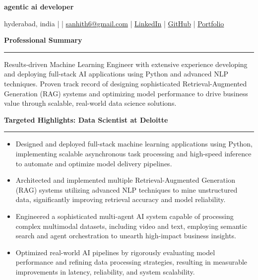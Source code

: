 \documentclass[9pt, letterpaper]{article}
\newcommand{\name}[1]{%
    \begin{center}
        {\LARGE \textbf{#1}}
    \end{center}
}
\newcommand{\sectionheading}[1]{%
    \vspace{4pt}%
    {\large \textbf{#1}}%
    \vspace{1pt}%
    \hrule
    \vspace{2pt}%
}
\begin{document}
\name{agentic ai developer}
\begin{center}
    hyderabad, india \quad |  \quad | \quad
    \href{mailto:sanhith6@gmail.com}{sanhith6@gmail.com} \quad | \quad
    \href{https://www.linkedin.com/in/sanhith-reddy-740a1625b/}{LinkedIn} \quad | \quad
    \href{https://github.com/tsanhith}{GitHub} \quad | \quad
    \href{https://johndoe.dev}{Portfolio}
\end{center}

\vspace{0pt}

\sectionheading{Professional Summary}
Results-driven Machine Learning Engineer with extensive experience developing and deploying full-stack AI applications using Python and advanced NLP techniques. Proven track record of designing sophisticated Retrieval-Augmented Generation (RAG) systems and optimizing model performance to drive business value through scalable, real-world data science solutions.

\sectionheading{Targeted Highlights: Data Scientist at Deloitte}
\begin{itemize}[leftmargin=0.25in, itemindent=-0.15in, label={--}]
    \item Designed and deployed full-stack machine learning applications using Python, implementing scalable asynchronous task processing and high-speed inference to automate and optimize model delivery pipelines.
    \item Architected and implemented multiple Retrieval-Augmented Generation (RAG) systems utilizing advanced NLP techniques to mine unstructured data, significantly improving retrieval accuracy and model reliability.
    \item Engineered a sophisticated multi-agent AI system capable of processing complex multimodal datasets, including video and text, employing semantic search and agent orchestration to unearth high-impact business insights.
    \item Optimized real-world AI pipelines by rigorously evaluating model performance and refining data processing strategies, resulting in measurable improvements in latency, reliability, and system scalability.
\end{itemize}
\end{document}
